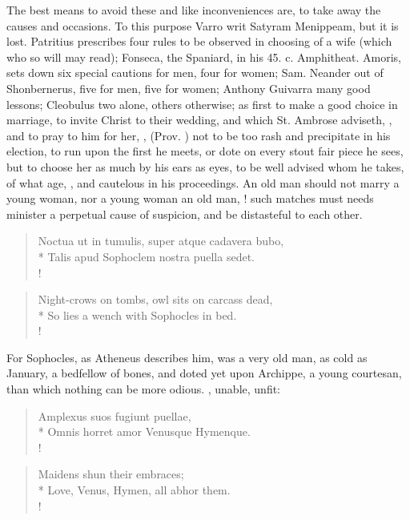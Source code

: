 The best means to avoid these and like inconveniences are, to take away
the causes and occasions. To this purpose Varro writ Satyram
Menippeam, but it is lost. Patritius prescribes four rules to be
observed in choosing of a wife (which who so will may read); Fonseca,
the Spaniard, in his 45. c. Amphitheat. Amoris, sets down six special
cautions for men, four for women; Sam. Neander out of Shonbernerus,
five for men, five for women; Anthony Guivarra many good lessons;
Cleobulus two alone, others otherwise; as first to make a good
choice in marriage, to invite Christ to their wedding, and which
St. Ambrose adviseth, , and to pray
to him for her, , (Prov. ) not to
be too rash and precipitate in his election, to run upon the first he
meets, or dote on every stout fair piece he sees, but to choose her as
much by his ears as eyes, to be well advised whom he takes, of what
age, \etc{}, and cautelous in his proceedings. An old man should not marry a
young woman, nor a young woman an old man, ! such matches
must needs minister a perpetual cause of suspicion, and be distasteful to each
other.
%
\begin{latin}%
\begin{verse}%
Noctua ut in tumulis, super atque cadavera bubo,\\*
Talis apud Sophoclem nostra puella sedet.\\!
\end{verse}%
\end{latin}%
\translationrule%
\begin{verse}%
Night-crows on tombs, owl sits on carcass dead,\\*
So lies a wench with Sophocles in bed.\\!
\end{verse}%
%

For Sophocles, as Atheneus describes him, was a very old man, as
cold as January, a bedfellow of bones, and doted yet upon Archippe, a
young courtesan, than which nothing can be more odious. , unable, unfit:
%
\begin{latin}%
\begin{verse}%
Amplexus suos fugiunt puellae,\\*
Omnis horret amor Venusque Hymenque.\\!
\end{verse}%
\end{latin}%
\translationrule%
\begin{verse}%
Maidens shun their embraces;\\*
Love, Venus, Hymen, all abhor them.\\!
\end{verse}%
%

